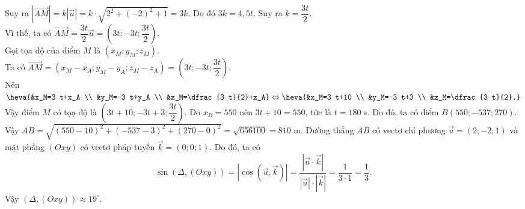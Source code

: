 \begin{ex}
{\begin{itemchoice}
Suy ra $\left|\overrightarrow{A M}\right|=k|\overrightarrow{u}|=k \cdot \sqrt{2^2+(-2)^2+1}=3 k$. Do đó $3 k=4{,}5 t$. Suy ra $k=\dfrac{3 t}{2}$. \\
Vì thế, ta có $\overrightarrow{A M}=\dfrac{3 t}{2} \overrightarrow{u}=\left(3 t ;-3 t ; \dfrac{3 t}{2}\right)$.\\
Gọi tọa độ của điểm $M$ là $\left(x_M ; y_M ; z_M\right)$.\\
Ta có $\overrightarrow{A M}=\left(x_M-x_A ; y_M-y_A ; z_M-z_A\right)=\left(3 t ;-3 t ; \dfrac{3 t}{2}\right)$.\\
Nên $\heva{&x_M=3 t+x_A \\ &y_M=-3 t+y_A \\ &z_M=\dfrac{3 t}{2}+z_A}\Leftrightarrow\heva{&x_M=3 t+10 \\ &y_M=-3 t+3 \\ &z_M=\dfrac{3 t}{2}.}$
Vậy điểm $M$ có tọạ độ là $\left(3 t+10 ;-3 t+3 ;\dfrac{3 t}{2}\right)$.
\itemch Do $x_B=550$ nên $3 t+10=550$, tức là $t=180$ s. Do đó, ta có điểm $B(550 ;-537 ; 270)$. \\
Vậy $A B=\sqrt{(550-10)^2+(-537-3)^2+(270-0)^2}=\sqrt{656100}=810$ m.
\itemch Đường thẳng $AB$ có vectơ chỉ phương $\overrightarrow{u}=(2 ;-2 ; 1)$ và mặt phẳng $(Oxy)$ có vectơ pháp tuyến $\overrightarrow{k}=(0 ; 0 ; 1)$. Do đó, ta có
\[
\sin (\Delta,(O x y))=|\cos (\overrightarrow{u},\overrightarrow{k})|=\dfrac{\left|\overrightarrow{u} \cdot \overrightarrow{k}\right|}{|\overrightarrow{u}| \cdot|\overrightarrow{k}|}=\dfrac{1}{3 \cdot 1}=\dfrac{1}{3}.\]
Vậy $(\Delta,(O x y)) \approx 19^{\circ}$.
\end{itemchoice}
}
\end{ex}

